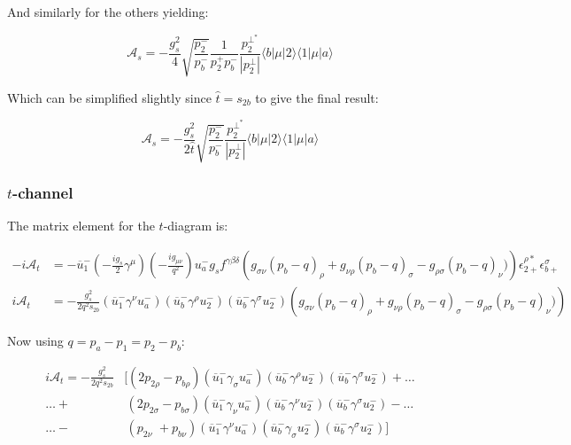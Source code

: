 			And similarly for the others yielding:

			\begin{equation}
			\mathcal{A}_s=-\frac{g_s^2}{4}\sqrt{\frac{p_2^-}{p_b^-}}\frac{1}{p_2^+p_b^-}\frac{p_2^{\perp^*}}{|p_2^\perp|}\langle{b}|\mu|2\rangle\langle{1}|\mu|a\rangle
			\end{equation}

			Which can be simplified slightly since $\hat{t}=s_{2b}$ to give the final result:

			\begin{equation}
			\mathcal{A}_s=-\frac{g_s^2}{2\hat{t}}\sqrt{\frac{p_2^-}{p_b^-}}\frac{p_2^{\perp^*}}{|p_2^\perp|}\langle{b}|\mu|2\rangle\langle{1}|\mu|a\rangle
			\end{equation}

		\subsubsection{$t$-channel}

		The matrix element for the $t$-diagram is:

			\begin{equation}
			\begin{split}
			-i\mathcal{A}_t &=-\overline{u}^-_1\left(-\frac{ig_s}{2}\gamma^\mu\right)\left(-\frac{ig_{\mu\nu}}{q^2}\right)u^-_ag_sf^{\gamma\beta\delta}
			\left(g_{\sigma\nu}(p_b-q)_\rho + g_{\nu\rho}(p_b-q)_\sigma - g_{\rho\sigma}(p_b-q)_\nu)\right)\epsilon^{\rho *}_{2+}\epsilon^{\sigma}_{b+}\\
			i\mathcal{A}_t &=-\frac{g_s^2}{2q^2s_{2b}}\left(\overline{u}^-_1\gamma^{\nu}u^-_a\right)\left(\overline{u}^-_b\gamma^{\rho}u^-_2\right)
			\left(\overline{u}^-_b\gamma^{\sigma}u^-_2\right)\left(g_{\sigma\nu}(p_b-q)_\rho + g_{\nu\rho}(p_b-q)_\sigma - g_{\rho\sigma}(p_b-q)_\nu)\right)
			\end{split}
			\end{equation}

			Now using $q=p_a-p_1=p_2-p_b$:

			\begin{align*}
			i\mathcal{A}_t = -\frac{g_s^2}{2q^2s_{2b}}&[(2p_{2\rho}-p_{b\rho})\left(\overline{u}^-_1\gamma_{\sigma}u^-_a\right)\left(\overline{u}^-_b\gamma^{\rho}u^-_2\right)\left(\overline{u}^-_b\gamma^{\sigma}u^-_2\right)+\ldots \\
			\ldots +&\hspace{2pt} (2p_{2\sigma}-p_{b\sigma})\left(\overline{u}^-_1\gamma_{\nu}u^-_a\right)\left(\overline{u}^-_b\gamma^{\nu}u^-_2\right)\left(\overline{u}^-_b\gamma^{\sigma}u^-_2\right)-\ldots \\
			\ldots -&\hspace{2pt} (p_{2\nu}\hspace{4pt}+p_{b\nu})\left(\overline{u}^-_1\gamma^{\nu}u^-_a\right)\left(\overline{u}^-_b\gamma_{\sigma}u^-_2\right)\left(\overline{u}^-_b\gamma^{\sigma}u^-_2\right)]
			\end{align*}

